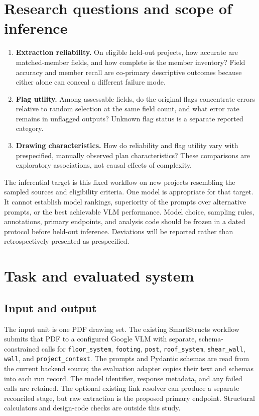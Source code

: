 \documentclass[11pt]{article}
\begin{document}
\section{Research questions and scope of inference}
\begin{enumerate}[leftmargin=*,label=\textbf{RQ\arabic*:}]
\item \textbf{Extraction reliability.} On eligible held-out projects, how accurate are matched-member fields, and how complete is the member inventory? Field accuracy and member recall are co-primary descriptive outcomes because either alone can conceal a different failure mode.
\item \textbf{Flag utility.} Among assessable fields, do the original flags concentrate errors relative to random selection at the same field count, and what error rate remains in unflagged outputs? Unknown flag status is a separate reported category.
\item \textbf{Drawing characteristics.} How do reliability and flag utility vary with prespecified, manually observed plan characteristics? These comparisons are exploratory associations, not causal effects of complexity.
\end{enumerate}
The inferential target is this fixed workflow on new projects resembling the sampled sources and eligibility criteria. One model is appropriate for that target. It cannot establish model rankings, superiority of the prompts over alternative prompts, or the best achievable VLM performance. Model choice, sampling rules, annotations, primary endpoints, and analysis code should be frozen in a dated protocol before held-out inference. Deviations will be reported rather than retrospectively presented as prespecified.

\section{Task and evaluated system}
\subsection{Input and output}
The input unit is one PDF drawing set. The existing SmartStructs workflow submits that PDF to a configured Google VLM with separate, schema-constrained calls for \texttt{floor\_system}, \texttt{footing}, \texttt{post}, \texttt{roof\_system}, \texttt{shear\_wall}, \texttt{wall}, and \texttt{project\_context}. The prompts and Pydantic schemas are read from the current backend source; the evaluation adapter copies their text and schemas into each run record. The model identifier, response metadata, and any failed calls are retained. The optional existing link resolver can produce a separate reconciled stage, but raw extraction is the proposed primary endpoint. Structural calculators and design-code checks are outside this study.
\end{document}
